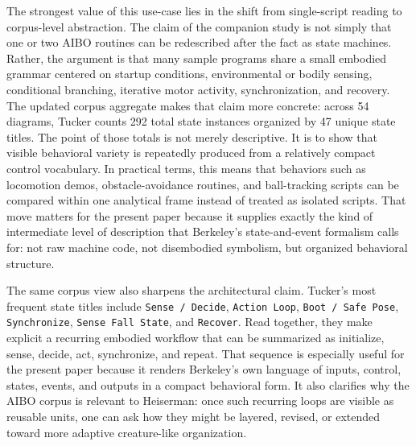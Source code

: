 \documentclass[11pt]{article}
\begin{document}
The strongest value of this use-case lies in the shift from single-script reading to corpus-level abstraction. The claim of the companion study is not simply that one or two AIBO routines can be redescribed after the fact as state machines. Rather, the argument is that many sample programs share a small embodied grammar centered on startup conditions, environmental or bodily sensing, conditional branching, iterative motor activity, synchronization, and recovery. The updated corpus aggregate makes that claim more concrete: across 54 diagrams, Tucker counts 292 total state instances organized by 47 unique state titles. The point of those totals is not merely descriptive. It is to show that visible behavioral variety is repeatedly produced from a relatively compact control vocabulary. In practical terms, this means that behaviors such as locomotion demos, obstacle-avoidance routines, and ball-tracking scripts can be compared within one analytical frame instead of treated as isolated scripts. That move matters for the present paper because it supplies exactly the kind of intermediate level of description that Berkeley's state-and-event formalism calls for: not raw machine code, not disembodied symbolism, but organized behavioral structure.

The same corpus view also sharpens the architectural claim. Tucker's most frequent state titles include \texttt{Sense / Decide}, \texttt{Action Loop}, \texttt{Boot / Safe Pose}, \texttt{Synchronize}, \texttt{Sense Fall State}, and \texttt{Recover}. Read together, they make explicit a recurring embodied workflow that can be summarized as initialize, sense, decide, act, synchronize, and repeat. That sequence is especially useful for the present paper because it renders Berkeley's own language of inputs, control, states, events, and outputs in a compact behavioral form. It also clarifies why the AIBO corpus is relevant to Heiserman: once such recurring loops are visible as reusable units, one can ask how they might be layered, revised, or extended toward more adaptive creature-like organization.
\end{document}

